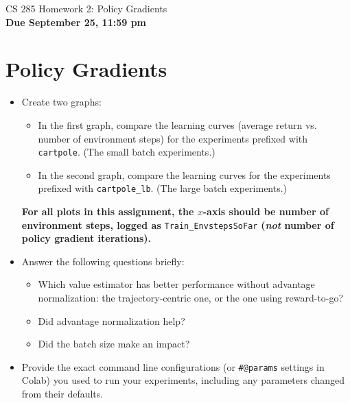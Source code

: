 \documentclass{article}
\begin{document}

\begin{centering}
    {\Large CS 285 Homework 2: Policy Gradients} \\
    \vspace{.25cm}
    \textbf{Due September 25, 11:59 pm} \\
\end{centering}

\setcounter{section}{2}
\section{Policy Gradients}
\begin{itemize}
\item Create two graphs:
\begin{itemize}
\item In the first graph, compare the learning curves (average return vs. number of environment steps) for the experiments prefixed with \verb|cartpole|. (The small batch experiments.)
\item In the second graph, compare the learning curves for the experiments prefixed with \verb|cartpole_lb|. (The large batch experiments.)
\end{itemize}
\textbf{For all plots in this assignment, the $x$-axis should be number of environment steps, logged as} \verb|Train_EnvstepsSoFar| \textbf{(\textit{not} number of policy gradient iterations).}
\item Answer the following questions briefly: 
\begin{itemize}
\item Which value estimator has better performance without advantage normalization: the trajectory-centric one, or the one using reward-to-go?
\item Did advantage normalization help?
\item Did the batch size make an impact?
\end{itemize}
\item Provide the exact command line configurations (or \texttt{\#@params} settings in Colab) you used to run your experiments, including any parameters changed from their defaults.
\end{itemize}
\end{document}
